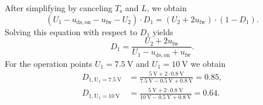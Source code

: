 \begin{solutionblock}
\begin{equation*}
    \end{equation*}
    After simplifying by canceling $T_\mathrm{s}$ and $L$, we obtain
    \begin{equation*}
        (U_\mathrm{1}-u_\mathrm{ds,on} - u_\mathrm{fw} - U_\mathrm{2}) \cdot D_\mathrm{1} =
        (U_\mathrm{2} + 2 u_\mathrm{fw}) \cdot (1-D_\mathrm{1}).
    \end{equation*}
    Solving this equation with respect to $D_\mathrm{1}$ yields
    \begin{equation*}
        D_\mathrm{1} = \frac{U_\mathrm{2}+ 2 u_\mathrm{fw}}{U_\mathrm{1}-u_\mathrm{ds,on} + u_\mathrm{fw}}.
    \end{equation*}
    For the operation points $U_\mathrm{1}=\SI{7.5}{\volt}$ and $U_\mathrm{1}=\SI{10}{\volt}$ we obtain
    \begin{align*}
        D_\mathrm{1, U_\mathrm{1} = \SI{7.5}{\volt}} & =\frac{\SI{5}{\volt} + 2 \cdot \SI{0.8}{\volt}}{\SI{7.5}{\volt} - \SI{0.5}{\volt} + \SI{0.8}{\volt}} = 0.85, \\
        D_\mathrm{1, U_\mathrm{1} = \SI{10}{\volt}}  & =\frac{\SI{5}{\volt} + 2 \cdot \SI{0.8}{\volt}} {\SI{10}{\volt} - \SI{0.5}{\volt} + \SI{0.8}{\volt}} = 0.64.
    \end{align*}

\end{solutionblock}

